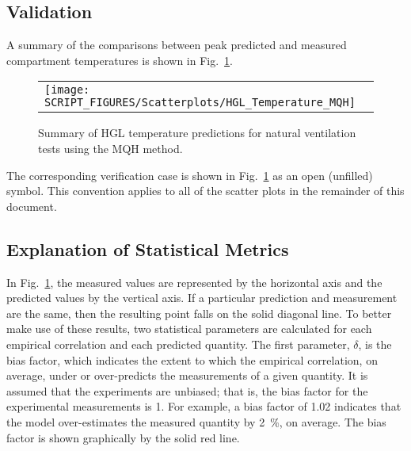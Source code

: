 \clearpage


\subsection*{Validation}

A summary of the comparisons between peak predicted and measured compartment temperatures is shown in Fig.~\ref{HGL_Summary_Natural_Ventilation}.

\begin{figure}[!ht]
\begin{center}
\begin{tabular}{l}
\texttt{[image: SCRIPT\_FIGURES/Scatterplots/HGL\_Temperature\_MQH]}
\end{tabular}
\end{center}
\caption[Summary of HGL temperature predictions for natural ventilation tests (MQH)]
{Summary of HGL temperature predictions for natural ventilation tests using the MQH method.}
\label{HGL_Summary_Natural_Ventilation}
\end{figure}

\noindent The corresponding verification case is shown in Fig.~\ref{HGL_Summary_Natural_Ventilation} as an open (unfilled) symbol. This convention applies to all of the scatter plots in the remainder of this document.


\clearpage


\subsection*{Explanation of Statistical Metrics}

In Fig.~\ref{HGL_Summary_Natural_Ventilation}, the measured values are represented by the horizontal axis and the predicted values by the vertical axis. If a particular prediction and measurement are the same, then the resulting point falls on the solid diagonal line. To better make use of these results, two statistical parameters are calculated for each empirical correlation and each predicted quantity. The first parameter, $\delta$, is the bias factor, which indicates the extent to which the empirical correlation, on average, under or over-predicts the measurements of a given quantity. It is assumed that the experiments are unbiased; that is, the bias factor for the experimental measurements is 1. For example, a bias factor of 1.02 indicates that the model over-estimates the measured quantity by \SI{2}{\percent}, on average. The bias factor is shown graphically by the solid red line.

